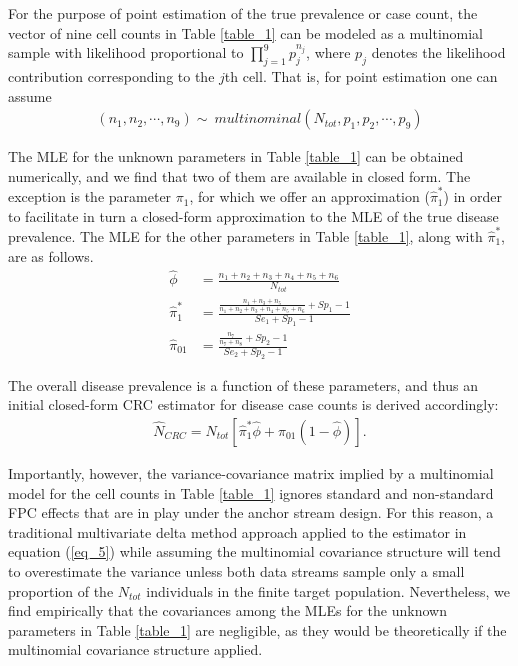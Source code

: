 \documentclass[useAMS,usenatbib,referee]{biom}
\begin{document}
For the purpose of point estimation of the true prevalence or case count, the vector of nine cell counts in Table \ref{table_1} can be modeled as a multinomial sample with likelihood proportional to $\prod_{j=1}^9 p_j^{n_j}$, where $p_j$ denotes the likelihood contribution corresponding to the $j$th cell. That is, for point estimation one can assume
\begin{align}
    (n_{1},n_{2}, \cdots, n_{9})\sim~multinominal(N_{tot}, p_{1},p_{2}, \cdots, p_{9})
\end{align}

The MLE for the unknown parameters in Table \ref{table_1} can be obtained numerically, and we find that two of them are available in closed form. The exception is the parameter $\pi_1$, for which we offer an approximation ($\hat{\pi}_1^*$) in order to facilitate in turn a closed-form approximation to the MLE of the true disease prevalence. The MLE for the other parameters in Table \ref{table_1}, along with $\hat{\pi}_1^*$, are as follows.
\begin{align*}
    \hat{\phi} &= \frac{n_1+n_2+n_3+n_4+n_5+n_6}{N_{tot}} \\
    \hat{\pi}_1^* &= \frac{\frac{n_1+n_3+n_5}{n_1+n_2+n_3+n_4+n_5+n_6}+Sp_1-1}{Se_1+Sp_1-1} \\
    \hat{\pi}_{01} &= \frac{\frac{n_7}{n_7+n_8}+Sp_2-1}{Se_2+Sp_2-1}
\end{align*}


The overall disease prevalence is a function of these parameters, and thus an initial closed-form CRC estimator for disease case counts is derived accordingly:
\begin{align}
    \hat{N}_{CRC} = N_{tot}[\hat{\pi}_{1}^*\hat{\phi} + \pi_{01}(1 - \hat{\phi})].
    \label{eq_5}
\end{align}

Importantly, however, the variance-covariance matrix implied by a multinomial model for the cell counts in Table \ref{table_1} ignores standard and non-standard FPC effects that are in play under the anchor stream design. For this reason, a traditional multivariate delta method approach applied to the estimator in equation (\ref{eq_5}) while assuming the multinomial covariance structure will tend to overestimate the variance unless both data streams sample only a small proportion of the $N_{tot}$ individuals in the finite target population. Nevertheless, we find empirically that the covariances among the MLEs for the unknown parameters in Table \ref{table_1} are negligible, as they would be theoretically if the multinomial covariance structure applied.
\end{document}
